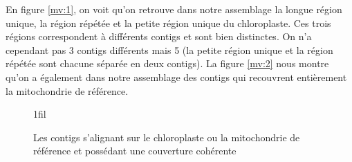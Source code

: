 \documentclass[a4paper]{article}
\makeatletter
\newcommand*{\centerfloat}{%
  \parindent \z@
  \leftskip \z@ \@plus 1fil \@minus \textwidth
  \rightskip\leftskip
  \parfillskip \z@skip}
\makeatother
\begin{document}
En figure \ref{mv:1}, on voit qu'on retrouve dans notre assemblage la longue région unique, la région répétée et la petite région unique du chloroplaste. Ces trois régions correspondent à différents contigs et sont bien distinctes. On n'a cependant pas 3 contigs différents mais 5 (la petite région unique et la région répétée sont chacune séparée en deux contigs). 
La figure \ref{mv:2} nous montre qu'on a également dans notre assemblage des contigs qui recouvrent entièrement la mitochondrie de référence. 

\begin{figure}[H]
\centerfloat

 \hspace{5mm}

\label{contig}
\caption{Les contigs s'alignant sur le chloroplaste ou la mitochondrie de référence et possédant une couverture cohérente}
\end{figure}
\end{document}
